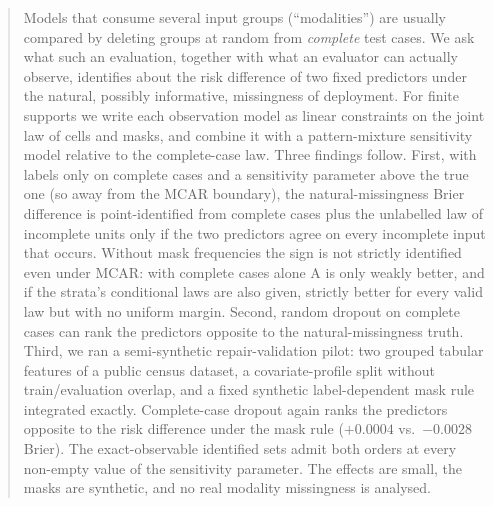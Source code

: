 \documentclass{article}
\theoremstyle{plain}
\theoremstyle{definition}
\theoremstyle{remark}
\begin{document}
\printAffiliationsAndNotice{}

\begin{abstract}
Models that consume several input groups (``modalities'') are usually
compared by deleting groups at random from \emph{complete} test cases. We ask
what such an evaluation, together with what an evaluator can actually
observe, identifies about the risk difference of two fixed predictors under
the natural, possibly informative, missingness of deployment. For finite
supports we write each observation model as linear constraints on the joint
law of cells and masks, and combine it with a pattern-mixture sensitivity
model relative to the complete-case law. Three findings follow. First, with
labels only on complete cases and a sensitivity parameter above the true
one (so away from the MCAR boundary), the natural-missingness Brier
difference is point-identified from complete cases plus the unlabelled law
of incomplete units only if the two predictors agree on every incomplete
input that occurs. Without
mask frequencies the sign is not strictly identified even under MCAR: with
complete cases alone A is only weakly better, and if the strata's conditional
laws are also given, strictly better for every valid law but with no uniform
margin. Second, random dropout on complete cases can rank the predictors
opposite to the natural-missingness truth. Third, we ran a semi-synthetic repair-validation pilot: two grouped tabular
features of a public census dataset, a covariate-profile split without
train/evaluation overlap, and a fixed synthetic label-dependent mask rule
integrated exactly. Complete-case dropout again ranks the predictors opposite
to the risk difference under the mask rule ($+0.0004$ vs.\ $-0.0028$ Brier).
The exact-observable identified sets admit both orders at every non-empty
value of the sensitivity parameter. The effects are small, the masks are
synthetic, and no real modality missingness is analysed.
\end{abstract}
\end{document}
